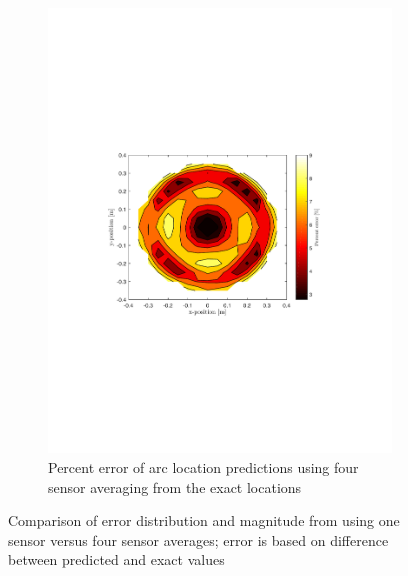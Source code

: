 \documentclass[onehalf,11pt]{beavtex}
\begin{document}
\begin{figure}[htbp]
\begin{subfigure}[b]{0.495\textwidth}
	\includegraphics[width=\textwidth]{four_sensor_percent_error_contour.pdf}
	\caption{Percent error of arc location predictions using four sensor averaging from the exact locations}
	\end{subfigure}
	\caption{Comparison of error distribution and magnitude from using one sensor versus four sensor averages; error is based on difference between predicted and exact values}
	\label{fig:4error}
\end{figure}
\end{document}
